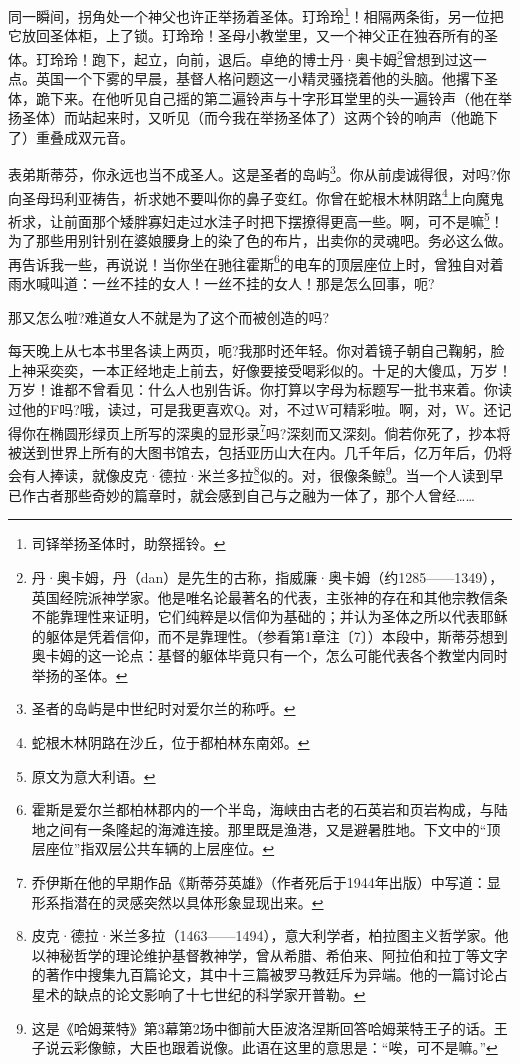 \par 同一瞬间，拐角处一个神父也许正举扬着圣体。玎玲玲\footnote{司铎举扬圣体时，助祭摇铃。}！相隔两条街，另一位把它放回圣体柜，上了锁。玎玲玲！圣母小教堂里，又一个神父正在独吞所有的圣体。玎玲玲！跑下，起立，向前，退后。卓绝的博士丹·奥卡姆\footnote{丹·奥卡姆，丹（dan）是先生的古称，指威廉·奥卡姆（约1285——1349），英国经院派神学家。他是唯名论最著名的代表，主张神的存在和其他宗教信条不能靠理性来证明，它们纯粹是以信仰为基础的；并认为圣体之所以代表耶稣的躯体是凭着信仰，而不是靠理性。（参看第1章注〔7〕）本段中，斯蒂芬想到奥卡姆的这一论点：基督的躯体毕竟只有一个，怎么可能代表各个教堂内同时举扬的圣体。}曾想到过这一点。英国一个下雾的早晨，基督人格问题这一小精灵骚挠着他的头脑。他撂下圣体，跪下来。在他听见自己摇的第二遍铃声与十字形耳堂里的头一遍铃声（他在举扬圣体）而站起来时，又听见（而今我在举扬圣体了）这两个铃的响声（他跪下了）重叠成双元音。
\par 表弟斯蒂芬，你永远也当不成圣人。这是圣者的岛屿\footnote{圣者的岛屿是中世纪时对爱尔兰的称呼。}。你从前虔诚得很，对吗?你向圣母玛利亚祷告，祈求她不要叫你的鼻子变红。你曾在蛇根木林阴路\footnote{蛇根木林阴路在沙丘，位于都柏林东南郊。}上向魔鬼祈求，让前面那个矮胖寡妇走过水洼子时把下摆撩得更高一些。啊，可不是嘛\footnote{原文为意大利语。}！为了那些用别针别在婆娘腰身上的染了色的布片，出卖你的灵魂吧。务必这么做。再告诉我一些，再说说！当你坐在驰往霍斯\footnote{霍斯是爱尔兰都柏林郡内的一个半岛，海峡由古老的石英岩和页岩构成，与陆地之间有一条隆起的海滩连接。那里既是渔港，又是避暑胜地。下文中的“顶层座位”指双层公共车辆的上层座位。}的电车的顶层座位上时，曾独自对着雨水喊叫道：一丝不挂的女人！一丝不挂的女人！那是怎么回事，呃?
\par 那又怎么啦?难道女人不就是为了这个而被创造的吗?
\par 每天晚上从七本书里各读上两页，呃?我那时还年轻。你对着镜子朝自己鞠躬，脸上神采奕奕，一本正经地走上前去，好像要接受喝彩似的。十足的大傻瓜，万岁！万岁！谁都不曾看见：什么人也别告诉。你打算以字母为标题写一批书来着。你读过他的F吗?哦，读过，可是我更喜欢Q。对，不过W可精彩啦。啊，对，W。还记得你在椭圆形绿页上所写的深奥的显形录\footnote{乔伊斯在他的早期作品《斯蒂芬英雄》（作者死后于1944年出版）中写道：显形系指潜在的灵感突然以具体形象显现出来。}吗?深刻而又深刻。倘若你死了，抄本将被送到世界上所有的大图书馆去，包括亚历山大在内。几千年后，亿万年后，仍将会有人捧读，就像皮克·德拉·米兰多拉\footnote{皮克·德拉·米兰多拉（1463——1494），意大利学者，柏拉图主义哲学家。他以神秘哲学的理论维护基督教神学，曾从希腊、希伯来、阿拉伯和拉丁等文字的著作中搜集九百篇论文，其中十三篇被罗马教廷斥为异端。他的一篇讨论占星术的缺点的论文影响了十七世纪的科学家开普勒。}似的。对，很像条鲸\footnote{这是《哈姆莱特》第3幕第2场中御前大臣波洛涅斯回答哈姆莱特王子的话。王子说云彩像鲸，大臣也跟着说像。此语在这里的意思是：“唉，可不是嘛。”}。当一个人读到早已作古者那些奇妙的篇章时，就会感到自己与之融为一体了，那个人曾经……
